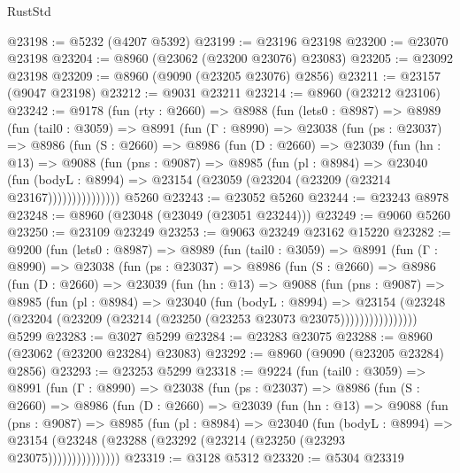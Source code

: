 \begin{lexlean}{RustStd}
\begin{coremodule}
@23198 := @5232 (@4207 @5392)
@23199 := @23196 @23198
@23200 := @23070 @23198
@23204 := @8960 (@23062 (@23200 @23076) @23083)
@23205 := @23092 @23198
@23209 := @8960 (@9090 (@23205 @23076) @2856)
@23211 := @23157 (@9047 @23198)
@23212 := @9031 @23211
@23214 := @8960 (@23212 @23106)
@23242 := @9178
    (fun (rty : @2660) =>
    @8988
      (fun (lets0 : @8987) =>
      @8989
        (fun (tail0 : @3059) =>
        @8991
          (fun (Γ : @8990) =>
          @23038
            (fun (ps : @23037) =>
            @8986
              (fun (S : @2660) =>
              @8986
                (fun (D : @2660) =>
                @23039
                  (fun (hn : @13) =>
                  @9088
                    (fun (pns : @9087) =>
                    @8985
                      (fun (pl : @8984) =>
                      @23040
                        (fun (bodyL : @8994) =>
                        @23154 (@23059 (@23204 (@23209 (@23214 @23167)))))))))))))))
    @5260
@23243 := @23052 @5260
@23244 := @23243 @8978
@23248 := @8960 (@23048 (@23049 (@23051 @23244)))
@23249 := @9060 @5260
@23250 := @23109 @23249
@23253 := @9063 @23249 @23162 @15220
@23282 := @9200
    (fun (lets0 : @8987) =>
    @8989
      (fun (tail0 : @3059) =>
      @8991
        (fun (Γ : @8990) =>
        @23038
          (fun (ps : @23037) =>
          @8986
            (fun (S : @2660) =>
            @8986
              (fun (D : @2660) =>
              @23039
                (fun (hn : @13) =>
                @9088
                  (fun (pns : @9087) =>
                  @8985
                    (fun (pl : @8984) =>
                    @23040
                      (fun (bodyL : @8994) =>
                      @23154
                        (@23248
                          (@23204 (@23209 (@23214 (@23250 (@23253 @23073 @23075))))))))))))))))
    @5299
@23283 := @3027 @5299
@23284 := @23283 @23075
@23288 := @8960 (@23062 (@23200 @23284) @23083)
@23292 := @8960 (@9090 (@23205 @23284) @2856)
@23293 := @23253 @5299
@23318 := @9224
    (fun (tail0 : @3059) =>
    @8991
      (fun (Γ : @8990) =>
      @23038
        (fun (ps : @23037) =>
        @8986
          (fun (S : @2660) =>
          @8986
            (fun (D : @2660) =>
            @23039
              (fun (hn : @13) =>
              @9088
                (fun (pns : @9087) =>
                @8985
                  (fun (pl : @8984) =>
                  @23040
                    (fun (bodyL : @8994) =>
                    @23154 (@23248 (@23288 (@23292 (@23214 (@23250 (@23293 @23075)))))))))))))))
@23319 := @3128 @5312
@23320 := @5304 @23319

\end{coremodule}
\end{lexlean}
